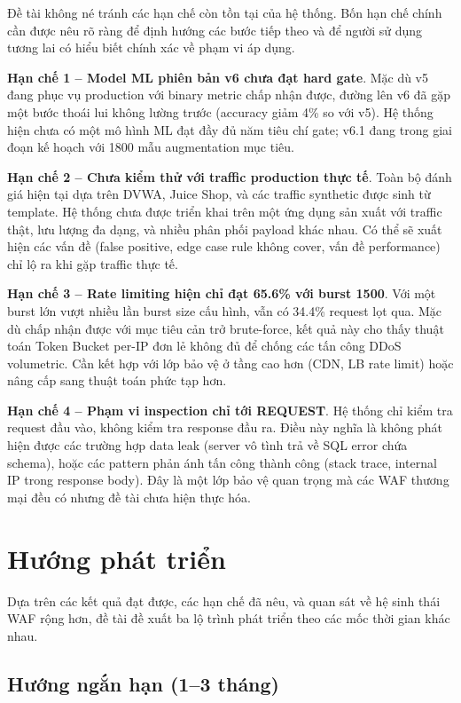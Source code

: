 \documentclass[../DoAn.tex]{subfiles}
\begin{document}
Đề tài không né tránh các hạn chế còn tồn tại của hệ thống. Bốn hạn chế
chính cần được nêu rõ ràng để định hướng các bước tiếp theo và để người
sử dụng tương lai có hiểu biết chính xác về phạm vi áp dụng.

\textbf{Hạn chế 1 -- Model ML phiên bản v6 chưa đạt hard gate}. Mặc dù v5
đang phục vụ production với binary metric chấp nhận được, đường lên v6 đã
gặp một bước thoái lui không lường trước (accuracy giảm 4\% so với v5).
Hệ thống hiện chưa có một mô hình ML đạt đầy đủ năm tiêu chí gate; v6.1
đang trong giai đoạn kế hoạch với 1800 mẫu augmentation mục tiêu.

\textbf{Hạn chế 2 -- Chưa kiểm thử với traffic production thực tế}. Toàn
bộ đánh giá hiện tại dựa trên DVWA, Juice Shop, và các traffic synthetic
được sinh từ template. Hệ thống chưa được triển khai trên một ứng dụng
sản xuất với traffic thật, lưu lượng đa dạng, và nhiều phân phối payload
khác nhau. Có thể sẽ xuất hiện các vấn đề (false positive, edge case rule
không cover, vấn đề performance) chỉ lộ ra khi gặp traffic thực tế.

\textbf{Hạn chế 3 -- Rate limiting hiện chỉ đạt 65.6\% với burst 1500}.
Với một burst lớn vượt nhiều lần burst size cấu hình, vẫn có 34.4\% request
lọt qua. Mặc dù chấp nhận được với mục tiêu cản trở brute-force, kết quả
này cho thấy thuật toán Token Bucket per-IP đơn lẻ không đủ để chống các
tấn công DDoS volumetric. Cần kết hợp với lớp bảo vệ ở tầng cao hơn (CDN,
LB rate limit) hoặc nâng cấp sang thuật toán phức tạp hơn.

\textbf{Hạn chế 4 -- Phạm vi inspection chỉ tới REQUEST}. Hệ thống chỉ
kiểm tra request đầu vào, không kiểm tra response đầu ra. Điều này nghĩa
là không phát hiện được các trường hợp data leak (server vô tình trả về
SQL error chứa schema), hoặc các pattern phản ánh tấn công thành công
(stack trace, internal IP trong response body). Đây là một lớp bảo vệ
quan trọng mà các WAF thương mại đều có nhưng đề tài chưa hiện thực hóa.

\section{Hướng phát triển}
\label{section:6.2}

Dựa trên các kết quả đạt được, các hạn chế đã nêu, và quan sát về hệ sinh
thái WAF rộng hơn, đề tài đề xuất ba lộ trình phát triển theo các mốc
thời gian khác nhau.

\subsection{Hướng ngắn hạn (1--3 tháng)}
\label{subsection:6.2.1}
\end{document}
